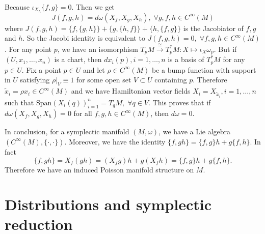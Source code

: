 Because $\iota_{X_h}\{f,g\}=0$. Then we get 
\begin{equation}
    J(f,g,h)=d\omega(X_f,X_g,X_h),\;\forall g,f,h\in C^\infty(M)
\end{equation}
where $J(f,g,h)=\{f,\{g,h\}\}+\{g,\{h,f\}\}+\{h,\{f,g\}\}$ is the Jacobiator of $f,g$ and $h$. So the Jacobi identity
is equivalent to $J(f,g,h)=0,\;\forall f,g,h\in C^\infty(M)$. For any point $p$, we have an isomorphism 
$T_pM\overset{\cong}{\to}T_p^*M:X\mapsto\iota_X\omega_p$. But if $(U,x_1,\dots,x_n)$ is a chart, then 
$dx_i(p),i=1,\dots,n$ is a basis of $T_p^*M$ for any $p\in U$. Fix a point $p\in U$ and let $\rho\in C^\infty(M)$ 
be a bump function with support in $U$ satisfying $\rho|_V\equiv 1$ for some open set $V\subset U$ containing $p$. Therefore 
$\widetilde{x}_i=\rho x_i\in C^\infty(M)$ and we have Hamiltonian vector fields $X_i=X_{\widetilde{x}_i},i=1,\dots,n$ 
such that $\text{Span}(X_i(q))_{i=1}^n=T_qM,\;\forall q\in V$. This proves that if $d\omega(X_f,X_g,X_h)=0$ for 
all $f,g,h\in C^\infty(M)$, then $d\omega=0$.\par 

In conclusion, for a symplectic manifold $(M,\omega)$, we have a Lie algebra $(C^\infty(M),\{\cdot,\cdot\})$. Moreover, 
we have the identity $\{f,gh\}=\{f,g\}h+g\{f,h\}$. In fact 
\begin{equation}
    \{f,gh\}=X_f(gh)=(X_fg)h+g(X_fh)=\{f,g\}h+g\{f,h\}.
\end{equation}
Therefore we have an induced Poisson manifold structure on $M$.

\section{Distributions and symplectic reduction}

